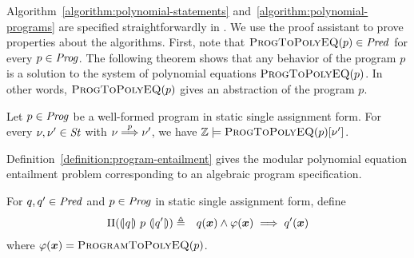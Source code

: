 Algorithm~\ref{algorithm:polynomial-statements}
and~\ref{algorithm:polynomial-programs} are specified straightforwardly 
in \gallina. We use the proof assistant \coq to prove properties
about the algorithms. First, note that $\textsc{ProgToPolyEQ}(p) \in
\mathit{Pred}$ for every $p \in \mathit{Prog}$. The following theorem shows that any
behavior of the program $p$ is a solution to the system of polynomial
equations $\textsc{ProgToPolyEQ}(p)$. In other words,
$\textsc{ProgToPolyEQ}(p)$ gives an abstraction of the program $p$.

\begin{theorem}
  Let $p \in \mathit{Prog}$ be a well-formed program in static single assignment
  form. For every $\nu, \nu' \in \mathit{St}$ with $\nu \overset{p}{\Longrightarrow} \nu'$, 
  we have $\mathbb{Z} \models \textsc{ProgToPolyEQ}(p) [\nu']$.
\end{theorem}

Definition~\ref{definition:program-entailment} gives the modular
polynomial equation entailment problem corresponding to an algebraic
program specification.
\begin{definition}
  For $q, q' \in \mathit{Pred}$ and $p \in \mathit{Prog}$ in static single assignment
  form, define
  \begin{eqnarray*}
    \Pi(\hoaretriple{q}{p}{q'}) & \defn &
    q(\vx) \wedge \varphi(\vx) \implies q'(\vx)
  \end{eqnarray*}
  where $\varphi(\vx) =
  \textsc{ProgramToPolyEQ}(p)$. 
  \label{definition:program-entailment}
\end{definition}

